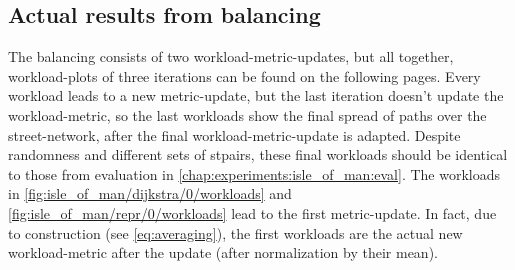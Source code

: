     \subsection{Actual results from balancing}

        The \gls{balancing} consists of two workload-\gls{metric}-updates, but all together, workload-plots of three iterations can be found on the following pages.
        Every workload leads to a new \gls{metric}-update, but the last iteration doesn't update the workload-\gls{metric}, so the last workloads show the final spread of paths over the street-network, after the final workload-\gls{metric}-update is adapted.
        Despite randomness and different sets of \glspl{stpair}, these final workloads should be identical to those from evaluation in \cref{chap:experiments:isle_of_man:eval}.
        The workloads in \cref{fig:isle_of_man/dijkstra/0/workloads} and \vref{fig:isle_of_man/repr/0/workloads} lead to the first \gls{metric}-update.
        In fact, due to construction (see \vref{eq:averaging}), the first workloads are the actual new workload-\gls{metric} after the update (after normalization by their mean).


